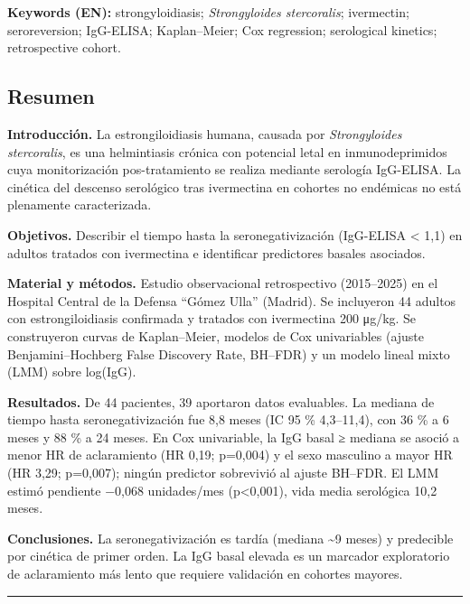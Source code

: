 \documentclass[
  spanish,
  12pt,
  a4paper,
]{article}
\begin{document}
\textbf{Keywords (EN):} strongyloidiasis; \emph{Strongyloides
stercoralis}; ivermectin; seroreversion; IgG-ELISA; Kaplan--Meier; Cox
regression; serological kinetics; retrospective cohort.

\newpage

\subsection*{Resumen}\label{resumen}

\textbf{Introducción.} La estrongiloidiasis humana, causada por
\emph{Strongyloides stercoralis}, es una helmintiasis crónica con
potencial letal en inmunodeprimidos cuya monitorización pos-tratamiento
se realiza mediante serología IgG-ELISA. La cinética del descenso
serológico tras ivermectina en cohortes no endémicas no está plenamente
caracterizada.

\textbf{Objetivos.} Describir el tiempo hasta la seronegativización
(IgG-ELISA \textless{} 1,1) en adultos tratados con ivermectina e
identificar predictores basales asociados.

\textbf{Material y métodos.} Estudio observacional retrospectivo
(2015--2025) en el Hospital Central de la Defensa ``Gómez Ulla''
(Madrid). Se incluyeron 44 adultos con estrongiloidiasis confirmada y
tratados con ivermectina 200 μg/kg. Se construyeron curvas de
Kaplan--Meier, modelos de Cox univariables (ajuste Benjamini--Hochberg
False Discovery Rate, BH--FDR) y un modelo lineal mixto (LMM) sobre
log(IgG).

\textbf{Resultados.} De 44 pacientes, 39 aportaron datos evaluables. La
mediana de tiempo hasta seronegativización fue 8,8 meses (IC 95 \%
4,3--11,4), con 36 \% a 6 meses y 88 \% a 24 meses. En Cox univariable,
la IgG basal ≥ mediana se asoció a menor HR de aclaramiento (HR 0,19;
p=0,004) y el sexo masculino a mayor HR (HR 3,29; p=0,007); ningún
predictor sobrevivió al ajuste BH--FDR. El LMM estimó pendiente −0,068
unidades/mes (p\textless0,001), vida media serológica 10,2 meses.

\textbf{Conclusiones.} La seronegativización es tardía (mediana
\textasciitilde9 meses) y predecible por cinética de primer orden. La
IgG basal elevada es un marcador exploratorio de aclaramiento más lento
que requiere validación en cohortes mayores.

\begin{center}\rule{0.5\linewidth}{0.5pt}\end{center}
\end{document}
